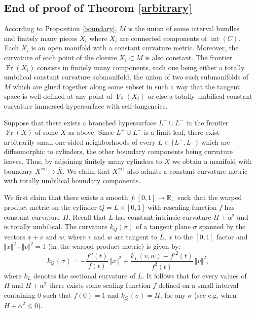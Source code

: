 \documentclass[10pt]{amsart}
\DeclareMathOperator{\Fr}{Fr}
\DeclareMathOperator{\inte}{int}
\let\parallel\Vert
\theoremstyle{definition}
\theoremstyle{remark}
\numberwithin{equation}{section}
\newcommand{\RR}{\mathbb R}
\providecommand{\eg}{e.g.}\providecommand{\ie}{i.e.}\providecommand{\etc}{etc.}\providecommand{\resp}{resp.}\providecommand{\cf}{cf.}
\begin{document}
\subsection{End of proof of Theorem \ref{arbitrary}}
According to Proposition \ref{boundary}, $M$ is the union of some interval bundles and finitely many pieces
$\overline{X_i}$ where $X_i$ are connected components of $\inte (C)$. Each $X_i$ is an open manifold with a constant curvature metric.
Moreover, the curvature of each point of the closure $\overline{X_i}\subset M$ is also constant. The frontier
$\Fr(X_i)$ consists in finitely many components, each one being either a totally umbilical constant curvature
submanifold, the union of two such submanifolds of $M$ which are glued together along some subset in such a way
that the tangent space is well-defined at any point of $\Fr(X_i)$ or else a
totally umbilical constant curvature immersed hypersurface with self-tangencies.

Suppose that there exists a branched hypersurface $L^+\cup L^-$ in the frontier $\Fr(X)$ of some $X$ as above.
Since $L^+\cup L^-$ is a limit leaf, there exist arbitrarily small one-sided neighborhoods
of every $L\in\{L^+,L^-\}$ which are diffeomorphic to cylinders, the other boundary components being curvature leaves.
Thus, by adjoining finitely many cylinders to $X$ we obtain a manifold with boundary $X^\mathrm{ext}\supset \overline{X}$.
We claim that $X^\mathrm{ext}$ also admits a constant curvature metric with totally umbilical boundary components.

We first claim that there exists a smooth $f:[0,1]\to \RR_+$ such that
the warped product metric on the cylinder $Q=L\times [0,1]$ with rescaling function $f$ has constant curvature $H$.
Recall that $L$ has constant intrinsic curvature $H+\alpha^2$ and is totally umbilical. The curvature $k_Q(\sigma)$ of a tangent plane
$\sigma$ spanned by the vectors $x+v$ and $w$, where $v$ and $w$ are tangent to $L$, $x$ to the $[0,1]$ factor and
$\parallel x\parallel^2+\parallel v\parallel^2=1$ (in~the warped product metric)
is given by:
\[ k_{Q^{}}(\sigma)=-\frac{f''(t)}{f(t)}\,\parallel x\parallel^2 + \frac{k_{L^{}}(v,w)-f'^2(t)}{f^2(t)}\,\parallel v\parallel^2,\]
where $k_L$ denotes the sectional curvature of $L$.
It follows that for every values of $H$ and $H+\alpha^2$ there exists some scaling function $f$ defined on a small interval
containing $0$ such that $f(0)=1$ and $ k_{Q^{}}(\sigma)=H$, for any $\sigma$ (see \eg \cite[Cor.\,7.10]{BO} when
$H+\alpha^2\leq 0$).
\end{document}
